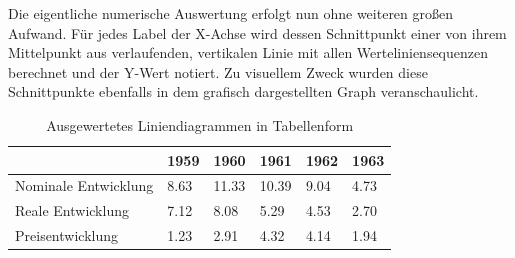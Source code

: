 Die eigentliche numerische Auswertung erfolgt nun ohne weiteren großen Aufwand. Für jedes Label der X-Achse wird dessen Schnittpunkt einer von ihrem Mittelpunkt aus verlaufenden, vertikalen Linie mit allen Werteliniensequenzen berechnet und der Y-Wert notiert. Zu visuellem Zweck wurden diese Schnittpunkte ebenfalls in dem grafisch dargestellten Graph veranschaulicht.

\begin{table}[H]
    \centering
    \begin{tabular}{|l|l|l|l|l|l|}
        \hline
        \rowcolor[HTML]{EFEFEF}
                             & 1959 & 1960  & 1961  & 1962 & 1963 \\ \hline
        Nominale Entwicklung & 8.63 & 11.33 & 10.39 & 9.04 & 4.73 \\ \hline
        Reale Entwicklung    & 7.12 & 8.08  & 5.29  & 4.53 & 2.70 \\ \hline
        Preisentwicklung     & 1.23 & 2.91  & 4.32  & 4.14 & 1.94 \\ \hline
    \end{tabular}
    \caption{Ausgewertetes Liniendiagrammen in Tabellenform}
\end{table}

